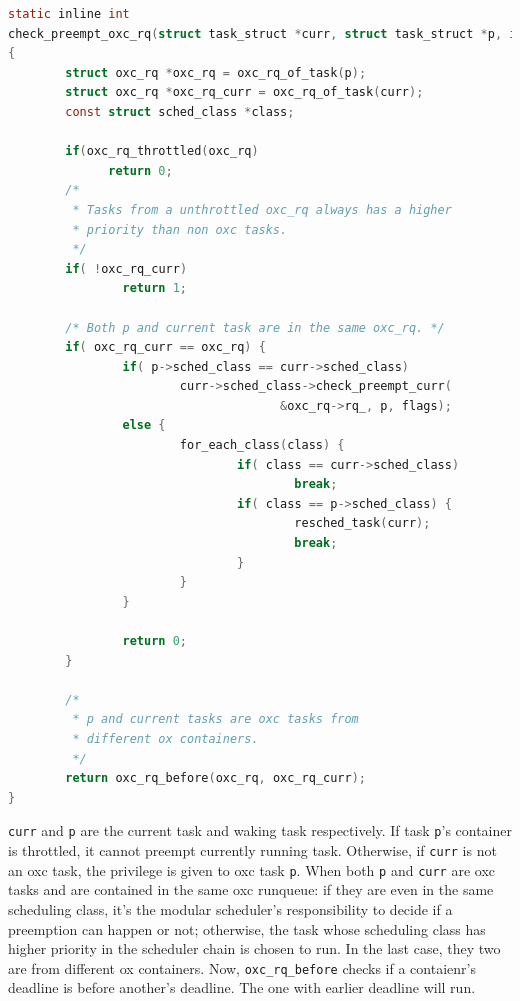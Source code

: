 \begin{lstlisting}[language=C, 
		caption={The preemption check for an oxc task},
		label={check_preempt}]
static inline int
check_preempt_oxc_rq(struct task_struct *curr, struct task_struct *p, int flags)
{
        struct oxc_rq *oxc_rq = oxc_rq_of_task(p);
        struct oxc_rq *oxc_rq_curr = oxc_rq_of_task(curr);
        const struct sched_class *class;

        if(oxc_rq_throttled(oxc_rq)
              return 0;
        /* 
         * Tasks from a unthrottled oxc_rq always has a higher 
         * priority than non oxc tasks.
         */
        if( !oxc_rq_curr)
                return 1;

        /* Both p and current task are in the same oxc_rq. */
        if( oxc_rq_curr == oxc_rq) {
                if( p->sched_class == curr->sched_class) 
                        curr->sched_class->check_preempt_curr(
                                      &oxc_rq->rq_, p, flags);
                else {
                        for_each_class(class) {
                                if( class == curr->sched_class)
                                        break;
                                if( class == p->sched_class) {
                                        resched_task(curr);
                                        break;
                                }
                        }
                }

                return 0;
        }

        /* 
         * p and current tasks are oxc tasks from 
         * different ox containers. 
         */
        return oxc_rq_before(oxc_rq, oxc_rq_curr);
}
\end{lstlisting}

\texttt{curr} and \texttt{p} are the current task and waking task 
respectively. If task \texttt{p}'s container is throttled, it cannot 
preempt currently running task. Otherwise, if \texttt{curr} is not an 
oxc task, the privilege is given to oxc task \texttt{p}.
When both \texttt{p} and \texttt{curr} are oxc tasks and are contained 
in the same oxc runqueue: if they are even in the same scheduling class, 
it's the modular scheduler's responsibility to decide if a preemption 
can happen or not; otherwise, the task whose scheduling class has higher 
priority in the scheduler chain is chosen to run. In the last case, they 
two are from different ox containers. Now, \texttt{oxc\_rq\_before} 
checks if a contaienr's deadline is before another's deadline. The one 
with earlier deadline will run. 

